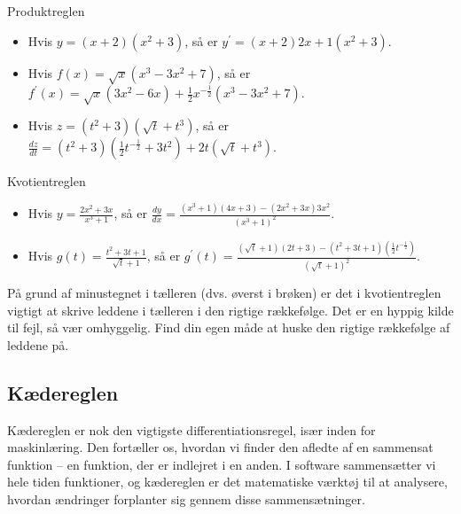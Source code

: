 \begin{example} Produktreglen

    \begin{itemize}
        \item Hvis \(y=(x+2)\left(x^2+3\right)\), så er \(y^{\prime}=(x+2) 2 x+1\left(x^2+3\right)\). \vspace{0.5em}
        \item Hvis \(f(x)=\sqrt{x}\left(x^3-3 x^2+7\right)\), så er \(f^{\prime}(x)=\sqrt{x}\left(3 x^2-6 x\right)+\frac{1}{2} x^{-\frac{1}{2}}\left(x^3-3 x^2+7\right)\). \vspace{0.5em}
        \item Hvis \(z=\left(t^2+3\right)\left(\sqrt{t}+t^3\right)\), så er \(\frac{d z}{d t}=\left(t^2+3\right)\left(\frac{1}{2} t^{-\frac{1}{2}}+3 t^2\right)+2 t\left(\sqrt{t}+t^3\right)\). \vspace{0.5em}
    \end{itemize}

\end{example}

\begin{example} Kvotientreglen

    \begin{itemize}
        \item Hvis \(y=\frac{2 x^2+3 x}{x^3+1}\), så er \(\frac{d y}{d x}=\frac{\left(x^3+1\right)(4 x+3)-\left(2 x^2+3 x\right) 3 x^2}{\left(x^3+1\right)^2}\). \vspace{0.5em}   
        \item Hvis \(g(t)=\frac{t^2+3 t+1}{\sqrt{t}+1}\), så er \(g^{\prime}(t)=\frac{(\sqrt{t}+1)(2 t+3)-\left(t^2+3 t+1\right)\left(\frac{1}{2} t^{-\frac{1}{2}}\right)}{(\sqrt{t}+1)^2}\). \vspace{0.5em}
    \end{itemize}
\end{example}

På grund af minustegnet i tælleren (dvs. øverst i brøken) er det i kvotientreglen vigtigt at skrive leddene i tælleren i den rigtige rækkefølge. Det er en hyppig kilde til fejl, så vær omhyggelig. Find din egen måde at huske den rigtige rækkefølge af leddene på.


\subsection*{Kædereglen}
Kædereglen er nok den vigtigste differentiationsregel, især inden for maskinlæring. Den fortæller os, hvordan vi finder den afledte af en sammensat funktion -- en funktion, der er indlejret i en anden. I software sammensætter vi hele tiden funktioner, og kædereglen er det matematiske værktøj til at analysere, hvordan ændringer forplanter sig gennem disse sammensætninger.

